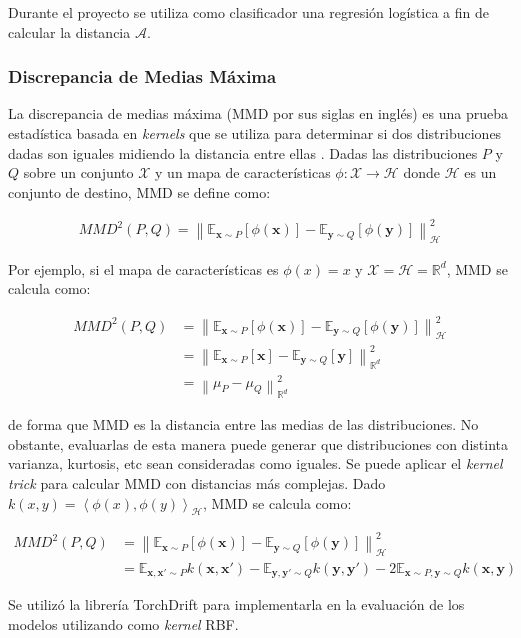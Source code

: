 Durante el proyecto se utiliza como clasificador una regresión logística a fin de calcular la distancia $\mathcal{A}$.

\subsubsection{Discrepancia de Medias Máxima}

La discrepancia de medias máxima (MMD por sus siglas en inglés) es una prueba estadística basada en {\it kernels} que
se utiliza para determinar si dos distribuciones dadas son iguales midiendo la distancia entre ellas \parencite{gretton2012kernel}. Dadas las distribuciones $P$ y $Q$ sobre un conjunto $\mathcal{X}$ y un mapa de
características $\phi : \mathcal{X} \rightarrow \mathcal{H}$ donde $\mathcal{H}$ es un conjunto de destino, MMD se
define como:

\begin{align}
    MMD^2(P, Q) = \left\lVert \mathbb{E}_{\mathbf{x} \sim P}[\phi(\mathbf{x})] - \mathbb{E}_{\mathbf{y} \sim Q}[\phi(\mathbf{y})]\right\rVert_{\mathcal{H}}^2
    \label{eq:mmd}
\end{align}

Por ejemplo, si el mapa de características es $\phi(x)=x$ y $\mathcal{X}=\mathcal{H}=\mathbb{R}^d$, MMD se calcula
como:

\begin{align}
    MMD^2(P, Q) & = \left\lVert \mathbb{E}_{\mathbf{x} \sim P}[\phi(\mathbf{x})] - \mathbb{E}_{\mathbf{y} \sim Q}[\phi(\mathbf{y})] \right\rVert_{\mathcal{H}}^2 \nonumber \\
                & = \left\lVert \mathbb{E}_{\mathbf{x} \sim P}[\mathbf{x}] - \mathbb{E}_{\mathbf{y} \sim Q}[\mathbf{y}] \right\rVert_{\mathbb{R}^d}^2            \nonumber \\
                & = \left\lVert \mu_{P} - \mu_{Q} \right\rVert_{\mathbb{R}^d}^2
    \label{eq:mmd-identidad}
\end{align}

de forma que MMD es la distancia entre las medias de las distribuciones. No obstante, evaluarlas de esta manera puede
generar que distribuciones con distinta varianza, kurtosis, etc sean consideradas como iguales. Se puede aplicar el
    {\it kernel trick} para calcular MMD con distancias más complejas. Dado $k(x, y) = \left\langle \phi(x), \phi(y)
    \right\rangle_{\mathcal{H}} $, MMD se calcula como:

\begin{align}
    MMD^2(P, Q) & = \left\lVert \mathbb{E}_{\mathbf{x} \sim P}[\phi(\mathbf{x})] - \mathbb{E}_{\mathbf{y} \sim Q}[\phi(\mathbf{y})] \right\rVert_{\mathcal{H}}^2 \nonumber                                                                          \\
                & = \mathbb{E}_{\mathbf{x}, \mathbf{x'} \sim P} k(\mathbf{x}, \mathbf{x'}) - \mathbb{E}_{\mathbf{y}, \mathbf{y'} \sim Q} k(\mathbf{y}, \mathbf{y'}) - 2 \mathbb{E}_{\mathbf{x} \sim P, \mathbf{y} \sim Q} k(\mathbf{x}, \mathbf{y})
    \label{eq:mmd-kernel}
\end{align}

Se utilizó la librería TorchDrift \parencite{torchdrift} para implementarla en la evaluación de los modelos utilizando como {\it kernel} RBF.